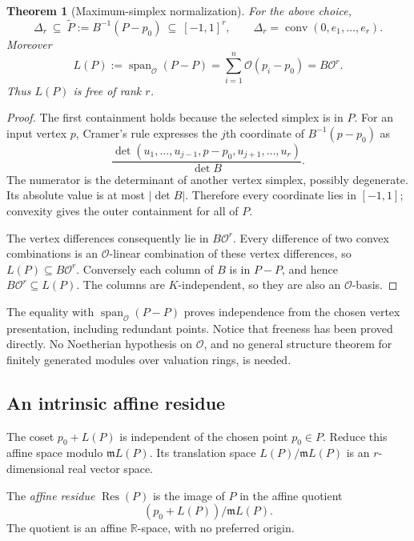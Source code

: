 \documentclass[11pt,a4paper]{article}
\numberwithin{equation}{section}
\newtheorem{theorem}{Theorem}[section]
\theoremstyle{plain}
\newcommand{\R}{\mathbb R}
\newcommand{\conv}{\operatorname{conv}}
\newcommand{\Span}{\operatorname{span}_{\R}}%
\newcommand{\OO}{\mathcal O}
\newcommand{\mm}{\mathfrak m}
\newcommand{\spanplain}{\operatorname{span}}%
\newcommand{\Res}{\operatorname{Res}}
\begin{document}
\begin{theorem}[Maximum-simplex normalization]
\label{poly:mv:thm:normalization}
For the above choice,
\begin{equation}
\label{poly:mv:eq:cube-sandwich}
 \Delta_r\ \subseteq\ \widetilde P:=B^{-1}(P-p_0)
      \ \subseteq\ [-1,1]^r,
 \qquad
 \Delta_r=\conv(0,e_1,\ldots,e_r).
\end{equation}
Moreover
\begin{equation}
\label{poly:mv:eq:lattice-basis}
 L(P):=\spanplain_{\OO}(P-P)
       =\sum_{i=1}^n\OO(p_i-p_0)=B\OO^r.
\end{equation}
Thus $L(P)$ is free of rank $r$.
\end{theorem}
\begin{proof}
The first containment holds because the selected simplex is in $P$.
For an input vertex $p$, Cramer's rule expresses the $j$th coordinate of
$B^{-1}(p-p_0)$ as
\[
 \frac{\det(u_1,\ldots,u_{j-1},p-p_0,u_{j+1},\ldots,u_r)}{\det B}.
\]
The numerator is the determinant of another vertex simplex, possibly
degenerate. Its absolute value is at most $|\det B|$. Therefore every
coordinate lies in $[-1,1]$; convexity gives the outer containment for all
of $P$.

The vertex differences consequently lie in $B\OO^r$. Every difference of
two convex combinations is an $\OO$-linear combination of these vertex
differences, so $L(P)\subseteq B\OO^r$. Conversely each column of $B$ is
in $P-P$, and hence $B\OO^r\subseteq L(P)$. The columns are $K$-independent,
so they are also an $\OO$-basis.
\end{proof}

The equality with $\spanplain_{\OO}(P-P)$ proves independence from the chosen
vertex presentation, including redundant points. Notice that freeness has
been proved directly. No Noetherian hypothesis on $\OO$, and no general
structure theorem for finitely generated modules over valuation rings,
is needed.

\subsection{An intrinsic affine residue}
The coset $p_0+L(P)$ is independent of the chosen point $p_0\in P$. Reduce
this affine space modulo $\mm L(P)$. Its translation space
$L(P)/\mm L(P)$ is an $r$-dimensional real vector space.

\begin{definition}\label{poly:mv:def:affine-residue}
The \emph{affine residue} $\Res(P)$ is the image of $P$ in the affine
quotient
\[
 (p_0+L(P))/\mm L(P).
\]
The quotient is an affine $\R$-space, with no preferred origin.
\end{definition}
\end{document}

